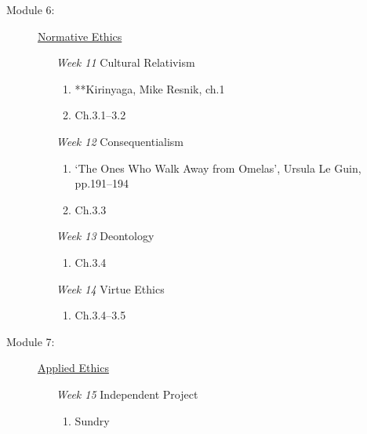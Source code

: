 \documentclass[article,oneside]{memoir}
\begin{document}
\begin{description}
\item[Module 6:] \href{http://scoconno.github.io/Teaching/Examined/Ethics/}{Normative Ethics}
\begin{enumerate}

\item[\textit{Week 11}] Cultural Relativism
\begin{enumerate}
\item **Kirinyaga, Mike Resnik, ch.1
\item Ch.3.1--3.2
\end{enumerate}
\item[\textit{Week 12}]  Consequentialism 
\begin{enumerate}
\item  `The Ones Who Walk Away from Omelas', Ursula Le Guin, pp.191--194 
\item Ch.3.3
\end{enumerate}
\item[\textit{Week 13}]  Deontology
\begin{enumerate}
\item Ch.3.4
\end{enumerate}

\item[\textit{Week 14}] Virtue Ethics
\begin{enumerate}
\item Ch.3.4--3.5
\end{enumerate}
\end{enumerate}

\item[Module 7:] \href{http://scoconno.github.io/Teaching/Examined/Applied/}{Applied Ethics}
\begin{enumerate}

\item[\textit{Week 15}] Independent Project
\begin{enumerate}
\item Sundry
\end{enumerate}
\end{enumerate}

\end{description}
\end{document}
